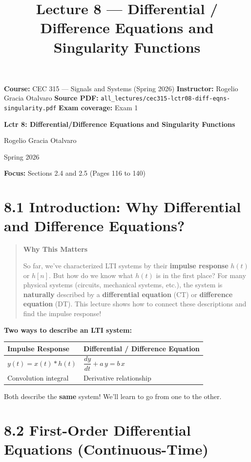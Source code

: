 \documentclass[11pt]{article}
\title{Lecture 8 — Differential / Difference Equations and Singularity Functions}
\author{}
\date{}
\begin{document}
\maketitle

\textbf{Course:} CEC 315 — Signals and Systems (Spring 2026)
\textbf{Instructor:} Rogelio Gracia Otalvaro
\textbf{Source PDF:} \texttt{all\_lectures/cec315-lctr08-diff-eqns-singularity.pdf}
\textbf{Exam coverage:} Exam 1

\textbf{Lctr 8: Differential/Difference Equations and Singularity Functions}

Rogelio Gracia Otalvaro

Spring 2026

\textbf{Focus:} Sections 2.4 and 2.5 (Pages 116 to 140)

\section*{8.1 Introduction: Why Differential and Difference Equations?}

\begin{quote}
\textbf{Why This Matters}

So far, we've characterized LTI systems by their \textbf{impulse response} $h(t)$ or $h[n]$. But how do we know what $h(t)$ is in the first place? For many physical systems (circuits, mechanical systems, etc.), the system is \textbf{naturally} described by a \textbf{differential equation} (CT) or \textbf{difference equation} (DT). This lecture shows how to connect these descriptions and find the impulse response!
\end{quote}

\textbf{Two ways to describe an LTI system:}

\begin{center}
\begin{tabular}{|l|l|}
\hline
\textbf{Impulse Response} & \textbf{Differential / Difference Equation} \\
\hline
$y(t) = x(t)*h(t)$ & $\dfrac{dy}{dt} + a\,y = b\,x$ \\
\hline
Convolution integral & Derivative relationship \\
\hline
\end{tabular}
\end{center}

Both describe the \textbf{same} system! We'll learn to go from one to the other.

\section*{8.2 First-Order Differential Equations (Continuous-Time)}
\end{document}
